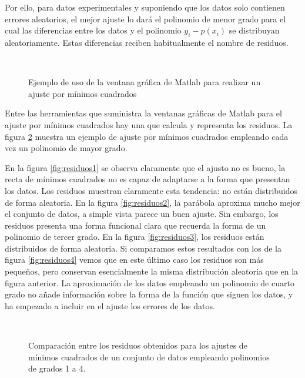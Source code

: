 Por ello, para datos experimentales y suponiendo que los datos solo contienen errores aleatorios, el mejor ajuste lo dará el polinomio de menor grado para el cual las diferencias entre los datos y el polinomio $y_i-p(x_i)$ se distribuyan aleatoriamente. Estas diferencias reciben habitualmente el nombre de residuos.  

\begin{figure}[h]
\centering
{} \qquad 
{}\\
\caption{Ejemplo de uso de la ventana gráfica de Matlab para realizar un ajuste por mínimos cuadrados}
\label{fig:minimos}
\end{figure}


Entre las herramientas que suministra la ventanas gráficas de Matlab para el ajuste por mínimos cuadrados hay una que calcula y representa los residuos.  La figura \ref{fig:residuos} muestra un ejemplo de ajuste por mínimos cuadrados empleando cada vez un polinomio de mayor grado. 
  
  
En la figura \ref{fig:residuos1} se observa claramente que el ajusto no es bueno, la recta de mínimos cuadrados no es capaz de adaptarse a la forma que presentan los datos. Los residuos muestran claramente esta tendencia: no están distribuidos de forma aleatoria. En la figura \ref{fig:residuos2}, la parábola aproxima mucho mejor el conjunto de datos, a simple vista parece un buen ajuste. Sin embargo, los residuos presenta una forma funcional clara que recuerda la forma de un polinomio de tercer grado. En la figura \ref{fig:residuos3}, los residuos están distribuidos de forma aleatoria. Si comparamos estos resultados con los de la figura \ref{fig:residuos4} vemos que en este último caso los residuos son más pequeños, pero conservan esencialmente la misma distribución aleatoria que en la figura anterior. La aproximación de los datos empleando un polinomio de cuarto grado no añade información sobre la forma de la función que siguen los datos, y ha empezado a incluir en el ajuste los errores de los datos. 

\begin{figure}[h]
\centering
{} \qquad 
{}\\
 \qquad 
{}
\caption{Comparación entre los residuos obtenidos para los ajustes de mínimos cuadrados de un conjunto de datos empleando polinomios de grados 1 a 4.} 
\label{fig:residuos}
\end{figure}
 
